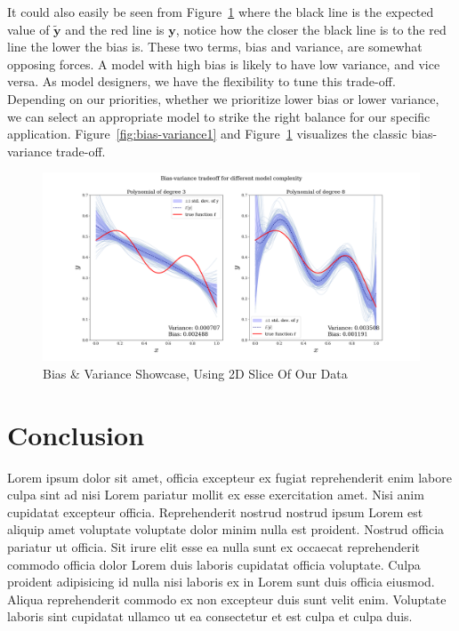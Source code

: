 \documentclass[twoside,11pt]{report}
\begin{document}
It could also easily be seen from Figure~\ref{fig:bias-variance2} where the black line is the expected value of $\mathbf{\tilde{y}}$ and 
the red line is $\mathbf{y}$, notice how the closer the black line is to the red line the lower the bias is.
These two terms, bias and variance, are somewhat opposing forces. A model with high bias is likely to 
have low variance, and vice versa. As model designers, we have the flexibility to tune this trade-off. 
Depending on our priorities, whether we prioritize lower bias or lower variance, we can select an appropriate 
model to strike the right balance for our specific application.
Figure~\ref{fig:bias-variance1} and Figure~\ref{fig:bias-variance2} visualizes the classic bias-variance trade-off.
\begin{figure}[!h]
    \begin{center}
        \includegraphics[width=1.0\textwidth]{../runsAndAdditions/bias-variance2.png}
    \end{center}
    \caption{Bias \& Variance Showcase, Using 2D Slice Of Our Data}\label{fig:bias-variance2}
\end{figure}








\section{Conclusion}
\label{sec:conclusion}


Lorem ipsum dolor sit amet, officia excepteur ex fugiat reprehenderit enim labore 
culpa sint ad nisi Lorem pariatur mollit ex esse exercitation amet. Nisi anim cupidatat 
excepteur officia. Reprehenderit nostrud nostrud ipsum Lorem est aliquip amet voluptate 
voluptate dolor minim nulla est proident. Nostrud officia pariatur ut officia. Sit irure 
elit esse ea nulla sunt ex occaecat reprehenderit commodo officia dolor Lorem duis laboris
cupidatat officia voluptate. Culpa proident adipisicing id nulla nisi laboris ex in Lorem 
sunt duis officia eiusmod. Aliqua reprehenderit commodo ex non excepteur duis sunt velit enim. 
Voluptate laboris sint cupidatat ullamco ut ea consectetur et est culpa et culpa duis.
\end{document}
